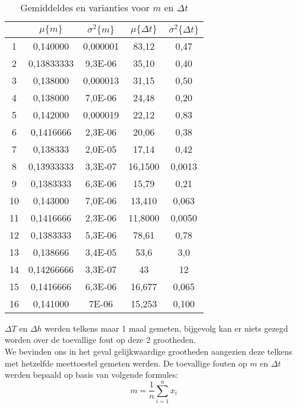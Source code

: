\begin{table}[h]
    \centering
    \label{tab:mDt}
    \caption{Gemiddeldes en varianties voor $m$ en $\Delta t$}
    \begin{tabular}{| c | c | c | c | c |}
        \hline
         & $\mu \{m\}$ & $\sigma ^2 \{m\}$ & $\mu \{\Delta t\}$ & $\sigma ^2 \{\Delta t\}$ \\ \hline
        1 & 0,140000 &  0,000001 &  83,12 & 0,47 \\ \hline
        2 & 0,13833333 &    9,3E-06 &   35,10 & 0,40 \\ \hline
        3 & 0,138000 &	0,000013 &	31,15 &	0,50 \\ \hline
        4 & 0,138000 &	7,0E-06 &	24,48 &	0,20 \\ \hline
        5 & 0,142000 &	0,000019 &	22,12 &	0,83 \\ \hline
        6 & 0,1416666 &	2,3E-06 &	20,06 &	0,38 \\ \hline
        7 & 0,138333 &	2,0E-05 &	17,14 &	0,42 \\ \hline
        8 & 0,13933333 &	3,3E-07 &	16,1500 &	0,0013 \\ \hline
        9 & 0,1383333 &	6,3E-06 &	15,79 &	0,21 \\ \hline
        10 & 0,143000 &	7,0E-06 &	13,410 &	0,063 \\ \hline
        11 & 0,1416666 &	2,3E-06 &	11,8000 &	0,0050 \\ \hline
        12 & 0,1383333 &	5,3E-06 &	78,61 &	0,78 \\ \hline
        13 & 0,138666 &	3,4E-05 &	53,6 &	3,0 \\ \hline
        14 & 0,14266666 &	3,3E-07 &	43 &	12 \\ \hline
        15 & 0,1416666 &	6,3E-06 &	16,677 &	0,065 \\ \hline
        16 & 0,141000 &	7E-06       &	15,253 &	0,100 \\ \hline
    \end{tabular}
\end{table}

$\Delta T$ en $\Delta h$ werden telkens maar 1 maal gemeten, bijgevolg kan er niets gezegd worden over de toevallige fout op deze 2 grootheden.
\\
We bevinden ons in het geval gelijkwaardige grootheden aangezien deze telkens met hetzelfde meettoestel gemeten werden.
De toevallige fouten op $m$ en $\Delta t$ werden bepaald op basis van volgende formules:
\begin{equation}
    m = \frac{1}{n} \sum\limits_{i=1}^n x_i
\end{equation}

